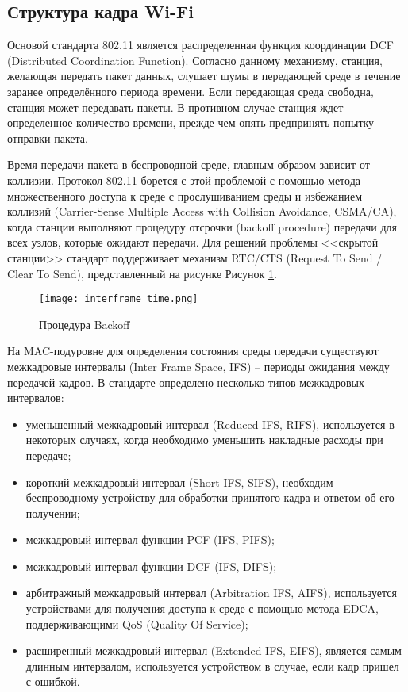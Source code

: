 \subsection{Структура кадра Wi-Fi}
 Основой стандарта 802.11 является распределенная функция координации DCF (Distributed Coordination Function). Согласно данному механизму, станция, желающая передать пакет данных, слушает шумы в передающей среде в течение заранее определённого периода времени. Если передающая среда свободна, станция может передавать пакеты. В противном случае станция ждет определенное количество времени, прежде чем опять предпринять попытку отправки пакета.

 Время передачи пакета в беспроводной среде, главным образом зависит от коллизии. Протокол 802.11 борется с этой проблемой с помощью метода множественного доступа к среде с прослушиванием среды и избежанием коллизий (Carrier-Sense Multiple Access with Collision Avoidance, CSMA/CA), когда станции выполняют процедуру отсрочки (backoff procedure) передачи для всех узлов, которые ожидают передачи. Для решений проблемы <<скрытой станции>> стандарт поддерживает механизм RTC/CTS (Request To Send / Clear To Send), представленный на рисунке Рисунок \cref{fig:part1_interframe_time}.

\begin{figure}[h!]
  \centering
   \texttt{[image: interframe\_time.png]}
\caption{Процедура Backoff}
\label{fig:part1_interframe_time}
\end{figure}

На MAC-подуровне  для определения состояния среды передачи существуют межкадровые интервалы (Inter Frame Space, IFS) -- периоды ожидания между передачей кадров. В стандарте определено несколько типов межкадровых интервалов:

\begin{itemize}
  \item уменьшенный межкадровый интервал (Reduced IFS, RIFS), используется в некоторых случаях, когда необходимо уменьшить накладные расходы при передаче;
  \item короткий межкадровый интервал (Short IFS, SIFS), необходим беспроводному устройству для обработки принятого кадра и ответом об его получении;
  \item межкадровый интервал функции PCF (IFS, PIFS);
  \item межкадровый интервал функции DCF (IFS, DIFS);
  \item арбитражный межкадровый интервал (Arbitration IFS, AIFS), используется устройствами для получения доступа к среде с помощью метода EDCA, поддерживающими QoS (Quality Of Service);
  \item расширенный межкадровый интервал (Extended IFS, EIFS), является самым длинным интервалом, используется устройством в случае, если кадр пришел с ошибкой.
\end{itemize}

